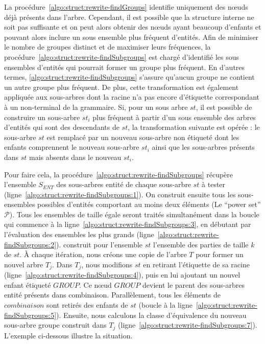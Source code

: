 La procédure~\ref{algo:struct:rewrite-findGroups} identifie uniquement des nœuds déjà présents dans l'arbre.
Cependant, il est possible que la structure interne ne soit pas suffisante et on peut alors obtenir des nœuds ayant beaucoup d'enfants et pouvant alors inclure un sous ensemble plus fréquent d'entités.
Afin de minimiser le nombre de groupes distinct et de maximiser leurs fréquences, la procédure~\ref{algo:struct:rewrite-findSubgroups} est chargé d'identifié les sous ensembles d'entités qui pourrait former un groupe plus fréquent.
En d'autres termes, \ref{algo:struct:rewrite-findSubgroups} s'assure qu'aucun groupe ne contient un autre groupe plus fréquent.
De plus, cette transformation est également appliquée aux sous-arbres dont la racine n'a pas encore d'étiquette correspondant à un non-terminal de la grammaire.
Si, pour un sous arbre $st$, il est possible de construire un sous-arbre $st_i$ plus fréquent à partir d'un sous ensemble des arbres d'entités qui sont des descendants de $st$, la transformation suivante est opérée : le sous-arbre $st$ est remplacé par un nouveau sous-arbre non étiqueté dont les enfants comprennent le nouveau sous-arbre $st_i$ ainsi que les sous-arbres présents dans $st$ mais absents dans le nouveau $st_i$.

Pour faire cela, la procédure~\ref{algo:struct:rewrite-findSubgroups} récupère l'ensemble $S_{ENT}$ des sous-arbres entité de chaque sous-arbre $st$ à tester (ligne~\ref{algo:struct:rewrite-findSubgroups:1}).
On construit ensuite tous les sous-ensembles possibles d'entités comportant au moins deux éléments (Le \enquote{power set} $\mathcal{P}$).
Tous les ensembles de taille égale seront traités simultanément dans la boucle  qui commence à la ligne~\ref{algo:struct:rewrite-findSubgroups:3}, en débutant par l'évaluation des ensembles les plus grands (ligne~\ref{algo:struct:rewrite-findSubgroups:2}).
\combination construit pour l'ensemble $st$ l'ensemble des parties de taille $k$ de $st$.
À chaque itération, nous créons une copie de l'arbre $T$ pour former un nouvel arbre $T_j$.
Dans $T_j$, nous modifions $st$ en retirant l'étiquette de sa racine (ligne~\ref{algo:struct:rewrite-findSubgroups:4}), puis en lui ajoutant un nouvel enfant étiqueté $GROUP$.
Ce nœud $GROUP$ devient le parent des sous-arbres entité présents dans \textsf{combinaison}.
Parallèlement, tous les éléments de $combinaison$ sont retirés des enfants de $st$ (boucle à la ligne~\ref{algo:struct:rewrite-findSubgroups:5}).
Ensuite, nous calculons la classe d'équivalence du nouveau sous-arbre groupe construit dans $T_j$ (ligne~\ref{algo:struct:rewrite-findSubgroups:7}).
L'exemple ci-dessous illustre la situation.

